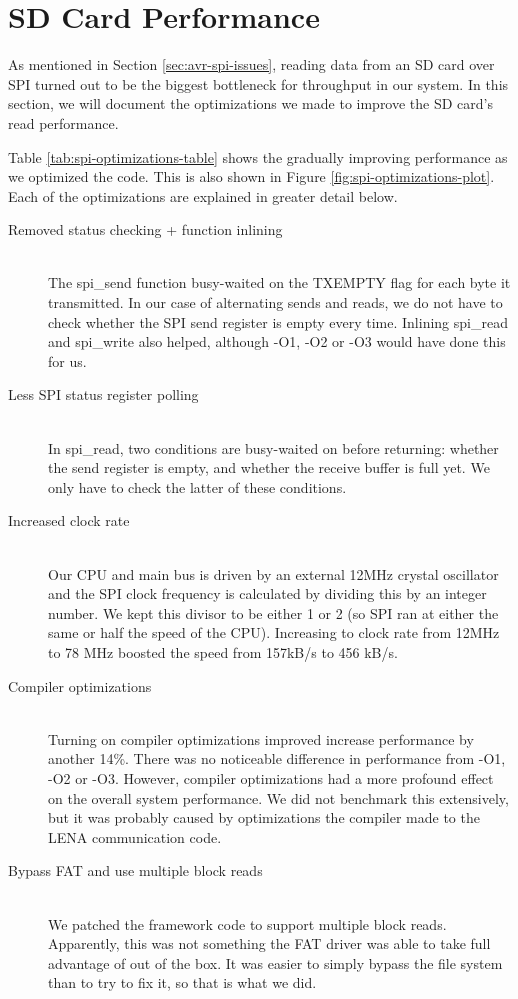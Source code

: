 \section{SD Card Performance}
\label{sec:performance-sd-card}

As mentioned in Section \ref{sec:avr-spi-issues}, reading data from an
SD card over SPI turned out to be the biggest bottleneck for throughput
in our system. In this section, we will document the optimizations we
made to improve the SD card's read performance.

Table \ref{tab:spi-optimizations-table} shows the gradually improving
performance as we optimized the code. This is also shown in Figure
\ref{fig:spi-optimizations-plot}. Each of the optimizations are
explained in greater detail below.

\begin{description}
	\item[Removed status checking + function inlining] \hfill \\
		The spi\_send function busy-waited on the TXEMPTY flag for each
		byte it transmitted. In our case of alternating sends and reads,
		we do not have to check whether the SPI send register is empty
		every time. Inlining spi\_read and spi\_write also helped,
		although -O1, -O2 or -O3 would have done this for us.
	\item[Less SPI status register polling] \hfill \\
		In spi\_read, two conditions are busy-waited on before
		returning: whether the send register is empty, and whether the
		receive buffer is full yet. We only have to check the latter of
		these conditions.
	\item[Increased clock rate] \hfill \\
		Our CPU and main bus is driven by an external 12MHz crystal
		oscillator and the SPI clock frequency is calculated by dividing
		this by an integer number. We kept this divisor to be either 1
		or 2 (so SPI ran at either the same or half the speed of the
		CPU). Increasing to clock rate from 12MHz to 78 MHz boosted the
		speed from 157kB/s to 456 kB/s.
	\item[Compiler optimizations] \hfill \\
		Turning on compiler optimizations improved increase performance
		by another 14\%. There was no noticeable difference in
		performance from -O1, -O2 or -O3. However, compiler
		optimizations had a more profound effect on the overall system
		performance. We did not benchmark this extensively, but it was
		probably caused by optimizations the compiler made to the \ac{LENA}
		communication code.
	\item[Bypass FAT and use multiple block reads] \hfill \\
		We patched the framework code to support multiple block reads.
		Apparently, this was not something the FAT driver was able to
		take full advantage of out of the box. It was easier to simply
		bypass the file system than to try to fix it, so that is what we
		did.
		

\end{description}
